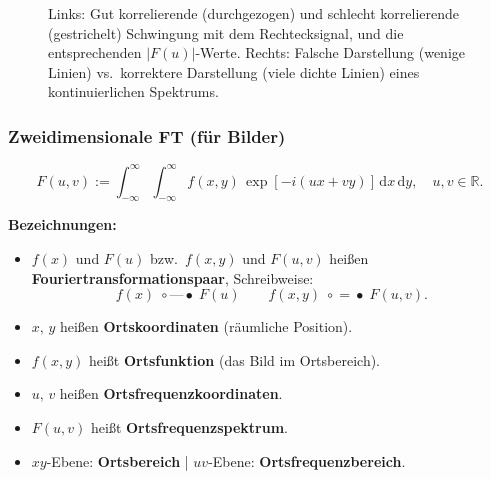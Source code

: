 \documentclass[12pt, a4paper]{article}
\begin{document}
\begin{figure}[H]
\caption{Links: Gut korrelierende (durchgezogen) und schlecht korrelierende (gestrichelt)
Schwingung mit dem Rechtecksignal, und die entsprechenden $|F(u)|$-Werte.
Rechts: Falsche Darstellung (wenige Linien) vs.\ korrektere Darstellung (viele dichte Linien)
eines kontinuierlichen Spektrums.}
\end{figure}

\subsubsection{Zweidimensionale FT (für Bilder)}

\[
  F(u,v) := \int_{-\infty}^{\infty}\!\!\int_{-\infty}^{\infty}
  f(x,y)\,\exp[-i(ux+vy)]\,\mathrm{d}x\,\mathrm{d}y,
  \quad u,v \in \mathbb{R}.
\]

\textbf{Bezeichnungen:}
\begin{itemize}
  \item $f(x)$ und $F(u)$ bzw.\ $f(x,y)$ und $F(u,v)$ heißen
        \textbf{Fouriertransformationspaar}, Schreibweise:
        \[ f(x) \;\circ\!\text{---}\!\bullet\; F(u)
           \qquad
           f(x,y) \;\circ\!=\!\bullet\; F(u,v). \]
  \item $x,\,y$ heißen \textbf{Ortskoordinaten} (räumliche Position).
  \item $f(x,y)$ heißt \textbf{Ortsfunktion} (das Bild im Ortsbereich).
  \item $u,\,v$ heißen \textbf{Ortsfrequenzkoordinaten}.
  \item $F(u,v)$ heißt \textbf{Ortsfrequenzspektrum}.
  \item $xy$-Ebene: \textbf{Ortsbereich} \quad|\quad
        $uv$-Ebene: \textbf{Ortsfrequenzbereich}.
\end{itemize}
\end{document}
